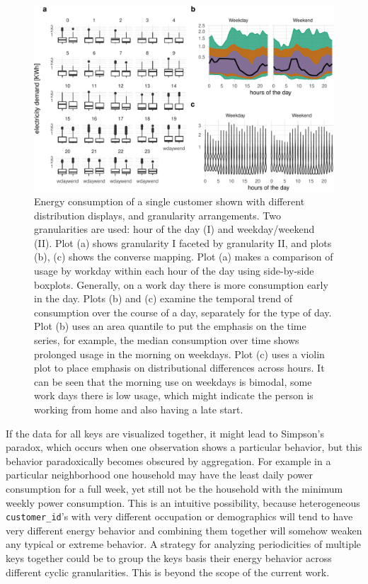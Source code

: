 \documentclass[12pt]{article}
\begin{document}
\begin{figure}

{\centering \includegraphics[width=0.9\linewidth]{figure/bothcust-1} 

}

\caption{Energy consumption of a single customer shown with different distribution displays, and granularity arrangements. Two granularities are used: hour of the day (I) and weekday/weekend (II). Plot (a) shows granularity I faceted by granularity II, and plots (b), (c) shows the converse mapping. Plot (a) makes a comparison of usage by workday within each hour of the day using side-by-side boxplots. Generally, on a work day there is more consumption early in the day. Plots (b) and (c) examine the temporal trend of consumption over the course of a day, separately for the type of day. Plot (b) uses an area quantile to put the emphasis on the time series, for example, the median consumption over time shows prolonged usage in the morning on weekdays. Plot (c) uses a violin plot to place emphasis on distributional differences across hours. It can be seen that the morning use on weekdays is bimodal, some work days there is low usage, which might indicate the person is working from home and also having a late start.}\label{fig:bothcust}
\end{figure}



If the data for all keys are visualized together, it might lead to Simpson's paradox, which occurs when one observation shows a particular behavior, but this behavior paradoxically becomes obscured by aggregation. For example in a particular neighborhood one household may have the least daily power consumption for a full week, yet still not be the household with the minimum weekly power consumption. This is an intuitive possibility, because heterogeneous \texttt{customer\_id}'s with very different occupation or demographics will tend to have very different energy behavior and combining them together will somehow weaken any typical or extreme behavior. A strategy for analyzing periodicities of multiple keys together could be to group the keys basis their energy behavior across different cyclic granularities. This is beyond the scope of the current work.
\end{document}
